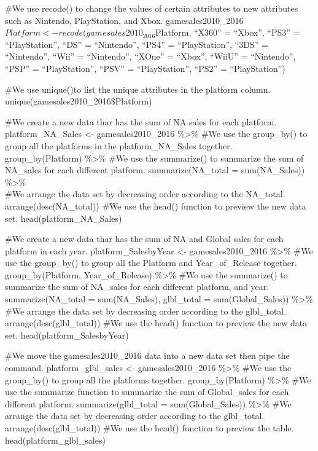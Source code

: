 \documentclass[
]{article}
\begin{document}
\#We use recode() to change the values of certain attributes to new
attributes such as Nintendo, PlayStation, and Xbox.
gamesales2010\_2016\(Platform <- recode(gamesales2010_2016\)Platform,
``X360'' = ``Xbox'', ``PS3'' = ``PlayStation'', ``DS'' = ``Nintendo'',
``PS4'' = ``PlayStation'', ``3DS'' = ``Nintendo'', ``Wii'' =
``Nintendo'', ``XOne'' = ``Xbox'', ``WiiU'' = ``Nintendo'', ``PSP'' =
``PlayStation'', ``PSV'' = ``PlayStation'', ``PS2'' = ``PlayStation'')

\#We use unique()to list the unique attributes in the platform column.
unique(gamesales2010\_2016\$Platform)

\#We create a new data thar has the sum of NA sales for each platform.
platform\_NA\_Sales \textless- gamesales2010\_2016 \%\textgreater\% \#We
use the group\_by() to group all the platforms in the
platform\_NA\_Sales together.\\
group\_by(Platform) \%\textgreater\% \#We use the summarize() to
summarize the sum of NA\_sales for each different platform.
summarize(NA\_total = sum(NA\_Sales)) \%\textgreater\%\\
\#We arrange the data set by decreasing order according to the
NA\_total. arrange(desc(NA\_total)) \#We use the head() function to
preview the new data set. head(platform\_NA\_Sales)

\#We create a new data thar has the sum of NA and Global sales for each
platform in each year. platform\_SalesbyYear \textless-
gamesales2010\_2016 \%\textgreater\% \#We use the group\_by() to group
all the Platform and Year\_of\_Release together. group\_by(Platform,
Year\_of\_Release) \%\textgreater\% \#We use the summarize() to
summarize the sum of NA\_sales for each different platform, and year.
summarize(NA\_total = sum(NA\_Sales), glbl\_total = sum(Global\_Sales))
\%\textgreater\%\\
\#We arrange the data set by decreasing order according to the
glbl\_total. arrange(desc(glbl\_total)) \#We use the head() function to
preview the new data set. head(platform\_SalesbyYear)

\#We move the gamesales2010\_2016 data into a new data set then pipe the
command. platform\_glbl\_sales \textless- gamesales2010\_2016
\%\textgreater\% \#We use the group\_by() to group all the platforms
together. group\_by(Platform) \%\textgreater\% \#We use the summarize
function to summarize the sum of Global\_sales for each different
platform. summarize(glbl\_total = sum(Global\_Sales)) \%\textgreater\%
\#We arrange the data set by decreasing order according to the
glbl\_total.\\
arrange(desc(glbl\_total)) \#We use the head() function to preview the
table. head(platform\_glbl\_sales)
\end{document}
